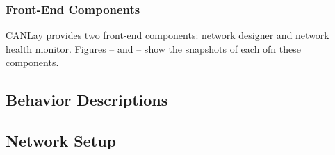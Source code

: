 \documentclass[letterpaper,twocolumn,12pt]{article}
\begin{document}
\subsubsection{Front-End Components}
CANLay provides two front-end components: network designer and network health monitor. Figures -- and -- show the snapshots of each ofn these components. 


\subsection{Behavior Descriptions}

\subsection{Network Setup}
\end{document}
